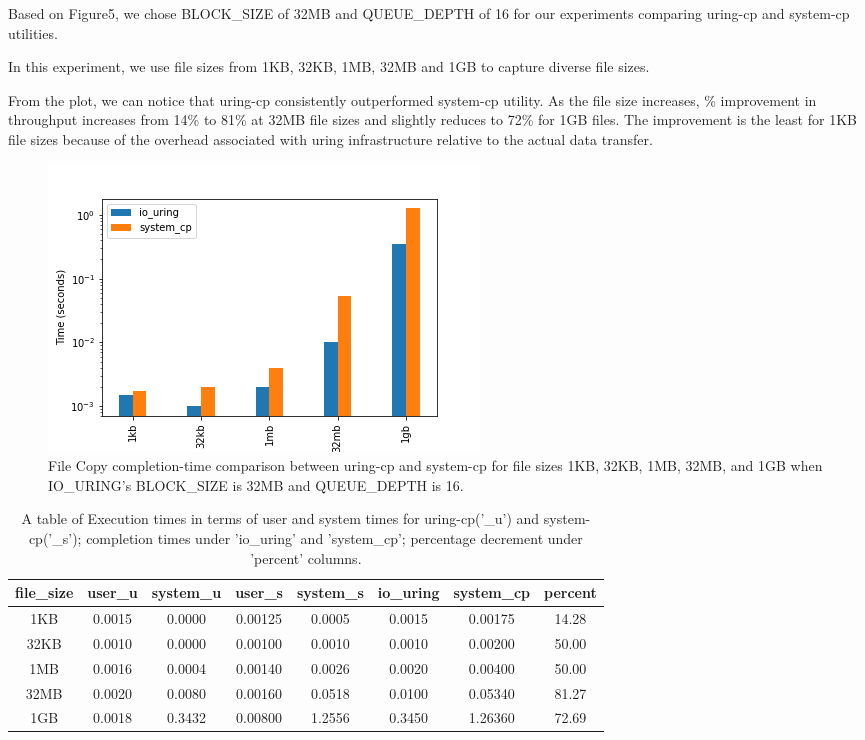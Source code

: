\documentclass{article}
\begin{document}
Based on Figure5, we chose BLOCK\_SIZE of 32MB and QUEUE\_DEPTH of 16 for our experiments comparing uring-cp and system-cp 
utilities. 

In this experiment, we use file sizes from 1KB, 32KB, 1MB, 32MB and 1GB to capture diverse file sizes.

From the plot, we can notice that uring-cp consistently outperformed system-cp utility. As the file size increases, \% improvement 
in throughput increases from 14\% to 81\% at 32MB file sizes and slightly reduces to 72\% for 1GB files. 
The improvement is the least for 1KB file sizes because of the overhead associated with uring infrastructure relative to the 
actual data transfer. 

\begin{figure}
    \centering
    \includegraphics[scale = 0.5]{cp_perf_compare.png}
    \caption{File Copy completion-time comparison between uring-cp and system-cp for file sizes
    1KB, 32KB, 1MB, 32MB, and 1GB when IO\_URING's BLOCK\_SIZE is 32MB and QUEUE\_DEPTH is 16.}
    \label{Figure6}
\end{figure}

\begin{table}
\centering
\begin{tabular}{|c|c|c|c|c|c|c|c|}

    \hline
    file\_size & user\_u & system\_u & user\_s & system\_s & io\_uring & system\_cp & percent \\
    \hline
    1KB    &   0.0015  & 0.0000 &0.00125 &  0.0005  & 0.0015 &  0.00175 &14.28 \\
    \hline
    32KB   &   0.0010  & 0.0000 &0.00100 &  0.0010  & 0.0010 &  0.00200 &50.00 \\
    \hline
    1MB    &   0.0016  & 0.0004 &0.00140 &  0.0026  & 0.0020 &  0.00400 &50.00 \\
    \hline
    32MB   &   0.0020  & 0.0080 &0.00160 &  0.0518  & 0.0100 &  0.05340 &81.27 \\
    \hline
    1GB    &   0.0018  & 0.3432 &0.00800 &  1.2556  & 0.3450 &  1.26360 &72.69 \\
    \hline

\end{tabular}
\caption{\label{tab:widgets}A table of Execution times in terms of user and system times for uring-cp('\_u') 
and system-cp('\_s'); completion times under 'io\_uring' and 'system\_cp'; percentage decrement under 
'percent' columns.}
\vspace{0.5cm}
\end{table}
\end{document}
